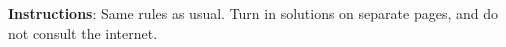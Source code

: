 \documentclass[12pt]{exam}
\begin{document}
\noindent \textbf{Instructions}: Same rules as usual.  Turn in solutions on separate pages, and do not consult the internet.

\begin{questions}

\end{questions}
\end{document}

